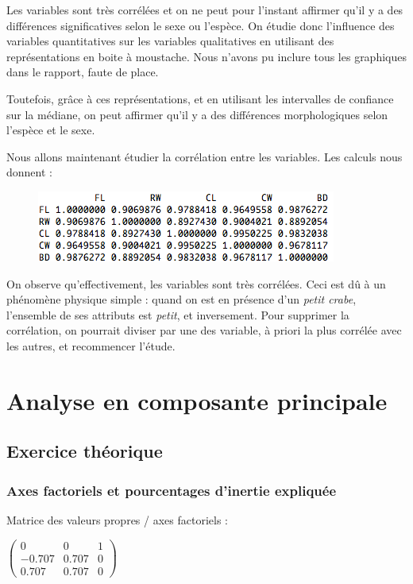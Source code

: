 \documentclass[a4paper,11pt]{article}
\begin{document}
\noindent Les variables sont très corrélées et on ne peut pour l'instant affirmer qu'il y a des différences significatives selon le sexe ou l'espèce. On étudie donc l'influence des variables quantitatives sur les variables qualitatives en  utilisant des représentations en boite à moustache. Nous n'avons pu inclure tous les graphiques dans le rapport, faute de place.

\noindent Toutefois, grâce à ces représentations, et en utilisant les intervalles de confiance sur la médiane, on peut affirmer qu'il y a des différences morphologiques selon l'espèce et le sexe. 

\noindent Nous allons maintenant étudier la corrélation entre les variables. Les calculs nous donnent :

\begin{figure}[H]
\begin{center}
\includegraphics[width=.5\textwidth]{img/corcrabs.png}
\end{center}
\end{figure}

\noindent On observe qu'effectivement, les variables sont très corrélées. Ceci est dû à un phénomène physique simple : quand on est en présence  d'un \textit{petit crabe}, l'ensemble de ses attributs est \textit{petit}, et inversement. Pour supprimer la corrélation, on pourrait diviser par une des variable, à priori la plus corrélée avec les autres, et recommencer l'étude.

\section{Analyse en composante principale}

\subsection{Exercice théorique}

\subsubsection{Axes factoriels et pourcentages d'inertie expliquée}
\noindent Matrice des valeurs propres / axes factoriels : 
\begin{center}
$ \begin{pmatrix}
0&0&1\\
-0.707&0.707&0\\
0.707&0.707&0
\end{pmatrix}$
\end{center}
\end{document}

